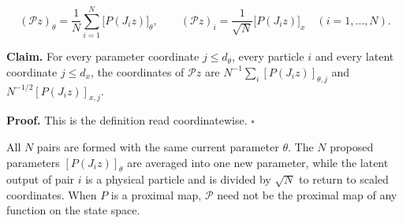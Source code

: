 \documentclass[11pt,a4paper]{report}
\begin{document}
\[(\mathcal Pz)_\theta=\frac1N\sum_{i=1}^N\bigl[P(J_iz)\bigr]_\theta,\qquad(\mathcal Pz)_i=\frac1{\sqrt N}\bigl[P(J_iz)\bigr]_x\quad(i=1,\dots,N).\]


\textbf{Claim.} For every parameter coordinate \(j\le d_\theta\), every particle \(i\) and every latent coordinate \(j\le d_x\), the coordinates of \(\mathcal Pz\) are \(N^{-1}\sum_i[P(J_iz)]_{\theta,j}\) and \(N^{-1/2}[P(J_iz)]_{x,j}\).




\textbf{Proof.} This is the definition read coordinatewise. \(\square\)




All \(N\) pairs are formed with the same current parameter \(\theta\). The \(N\) proposed parameters \([P(J_iz)]_\theta\) are averaged into one new parameter, while the latent output of pair \(i\) is a physical particle and is divided by \(\sqrt N\) to return to scaled coordinates. When \(P\) is a proximal map, \(\mathcal P\) need not be the proximal map of any function on the state space.
\end{document}

